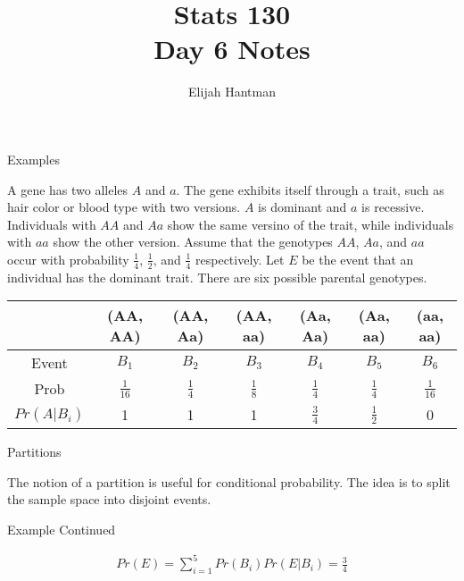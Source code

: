 \documentclass{report}
\title{\Huge{Stats 130}\\Day 6 Notes}
\author{\huge{Elijah Hantman}}
\date{}
\begin{document}
\maketitle
\newpage

\begin{description}
   \item {\large Examples}
       \begin{mdframed}
           A gene has two alleles $A$ and
           $a$. The gene exhibits itself
           through a trait, such as hair color
           or blood type with two versions. $A$ is
           dominant and $a$ is recessive. Individuals
           with  $AA$ and  $Aa$ show the same versino
           of the trait, while individuals with
            $aa$ show the other version. Assume that the
            genotypes  $AA$,  $Aa$, and  $aa$ occur with
            probability $\frac{1}{4}$, $\frac{1}{2}$, and
            $\frac{1}{4}$ respectively. Let $E$ be the event
            that an individual has the dominant trait. There
            are six possible parental genotypes.

            \begin{center}
                \begin{tabular}{| c | c | c | c | c | c | c |}
                    \hline
                & (AA, AA) & (AA, Aa) & (AA, aa) & (Aa, Aa) & (Aa, aa) & (aa, aa) \\
                \hline
                    Event & $B_1$ & $B_2$ & $B_3$ & $B_4$ & $B_5$ & $B_6$ \\
                    \hline
                    Prob & $\frac{1}{16}$ & $\frac{1}{4}$ & $\frac{1}{8}$ & $\frac{1}{4}$ & $\frac{1}{4}$ & $\frac{1}{16}$ \\
                    \hline
                    $Pr(A|B_i)$ & 1 & 1 & 1 &  $\frac{3}{4}$ &  $\frac{1}{2}$ & 0\\
                    \hline
                \end{tabular}
            \end{center}
       \end{mdframed}
   \item {\large Partitions}
       \begin{mdframed}
           The notion of a partition is useful for conditional
           probability. The idea is to split the sample
           space into disjoint events.
       \end{mdframed}
   \item {\large Example Continued}
       \begin{mdframed}
           \begin{gather}
            Pr(E) = \sum_{i=1}^5 Pr(B_i)Pr(E|B_i) = \frac{3}{4}
           \end{gather}


\end{mdframed}
\end{description}
\end{document}
